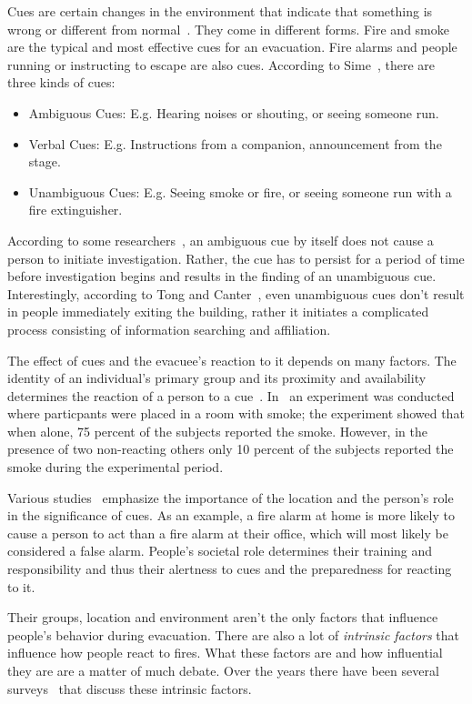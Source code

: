 Cues are certain changes in the environment that indicate that something is wrong or different from normal~\cite{Sime:1983uy}.
They come in different forms. Fire and smoke are the typical and most effective cues for an evacuation. Fire alarms and people running or instructing to escape are also cues. According to Sime~\cite{Sime:1983uy}, there are three kinds of cues:
\begin{itemize}
\item Ambiguous Cues: E.g. Hearing noises or shouting, or seeing someone run.
\item Verbal Cues: E.g. Instructions from a companion, announcement from the stage.
\item Unambiguous Cues: E.g. Seeing smoke or fire, or seeing someone run with a fire extinguisher.
\end{itemize}


According to some researchers~\cite{Ramachandran:1990wj,Proulx:2007ul}, an ambiguous cue by itself does not cause a person to initiate investigation. Rather, the cue has to persist for a period of time before investigation begins and results in the finding of an unambiguous cue. Interestingly, according to Tong and Canter~\cite{Tong:1985wn}, even unambiguous cues don't result in people immediately exiting the building, rather it initiates a complicated process consisting of information searching and affiliation.

The effect of cues and the evacuee's reaction to it depends on many factors. The identity of an individual's primary group and its proximity and availability determines the reaction of a person to a cue~\cite{Sime:1983uy}. In~\cite{Latane:1969wm} an experiment was conducted where particpants were placed in a room with smoke; the experiment showed that when alone, 75 percent of the subjects reported the smoke. However, in the presence of two non-reacting others only 10 percent of the subjects reported the smoke during the experimental period.

Various studies~\cite{Proulx:2003tc,Proulx:2001we,Paulsen:1984ti,Sandberg:1997tw,Cocking:2008vv,Tong:1985wn} emphasize the importance of the location and the person's role in the significance of cues. As an example, a fire alarm at home is more likely to cause a person to act than a fire alarm at their office, which will most likely be considered a false alarm. People's societal role determines their training and responsibility and thus their alertness to cues and the preparedness for reacting to it.

Their groups, location and environment aren't the only factors that influence people's behavior during evacuation. There are also a lot of \emph{intrinsic factors} that influence how people react to fires. What these factors are and how influential they are are a matter of much debate. Over the years there have been several surveys~\cite{Tong:1985wn,Sandberg:1997tw,Kuligowski:2009un} that discuss these intrinsic factors.

